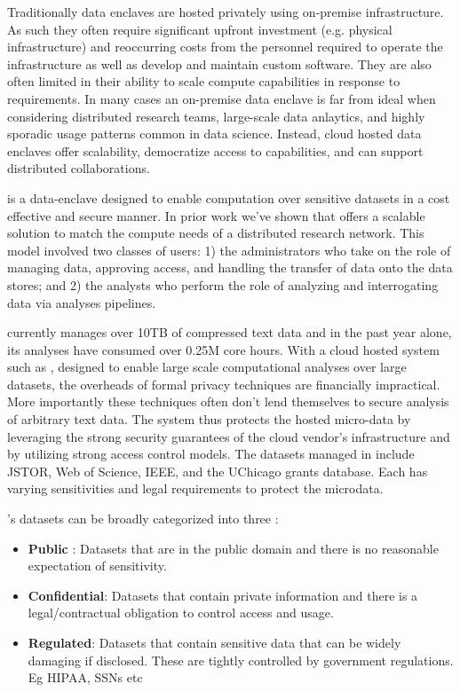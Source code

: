 Traditionally data enclaves are hosted privately using on-premise infrastructure. As 
such they often require significant upfront investment (e.g. physical infrastructure) and reoccurring costs 
from the personnel required to operate the infrastructure as well as develop and maintain custom software. 
They are also often limited in their ability to scale
compute capabilities in response to requirements. In many cases an on-premise data enclave is far from ideal
when considering distributed research teams, large-scale data anlaytics, and highly sporadic
usage patterns common in data science. Instead, cloud hosted data enclaves offer scalability,
democratize access to capabilities, and can support distributed collaborations. 

\NAME is a data-enclave designed to enable computation over sensitive datasets
in a cost effective and secure manner. In prior work we've shown that \NAME offers
a scalable solution to match the compute needs of a distributed research network.
This model involved two classes of users: 1) the administrators who take on the role of managing
data, approving access, and handling the transfer of data onto the data stores; and 2) the analysts
who perform the role of analyzing and interrogating data via analyses pipelines.

\NAME currently manages over 10TB of compressed text data and in the past year
alone, its analyses have consumed over 0.25M core hours. With a cloud hosted system
such as \NAMENS, designed to enable large scale computational analyses over large datasets,
the overheads of formal privacy techniques are financially impractical. More importantly
these techniques often don't lend themselves to secure analysis of arbitrary text data. 
The system thus protects the hosted micro-data by leveraging the strong security
guarantees of the cloud vendor's infrastructure and by utilizing strong access control
models. The datasets managed in \NAME include JSTOR, Web of Science, IEEE,
and the UChicago grants database. Each has varying sensitivities and legal requirements to
protect the microdata.

\NAMENS's datasets can be broadly categorized into three \cite{ist_dataclass}:
\begin{itemize}
\item \textbf{Public} : Datasets that are in the public domain and there is no
  reasonable expectation of sensitivity.
\item \textbf{Confidential}: Datasets that contain private information and there is a legal/contractual obligation to control access and usage.
\item \textbf {Regulated}: Datasets that contain sensitive data that can be widely damaging if disclosed.
  These are tightly controlled by government regulations. Eg HIPAA, SSNs etc
\end{itemize}

